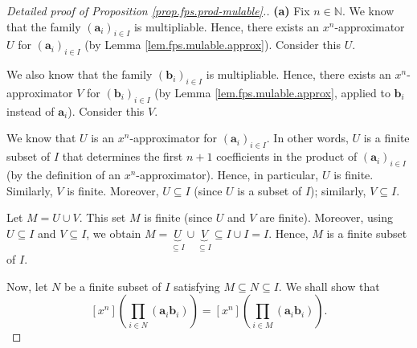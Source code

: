 \begin{fineprint}
\begin{proof}
[Detailed proof of Proposition \ref{prop.fps.prod-mulable}.]\textbf{(a)} Fix
$n\in\mathbb{N}$. We know that the family $\left(  \mathbf{a}_{i}\right)
_{i\in I}$ is multipliable. Hence, there exists an $x^{n}$-approximator $U$
for $\left(  \mathbf{a}_{i}\right)  _{i\in I}$ (by Lemma
\ref{lem.fps.mulable.approx}). Consider this $U$.

We also know that the family $\left(  \mathbf{b}_{i}\right)  _{i\in I}$ is
multipliable. Hence, there exists an $x^{n}$-approximator $V$ for $\left(
\mathbf{b}_{i}\right)  _{i\in I}$ (by Lemma \ref{lem.fps.mulable.approx},
applied to $\mathbf{b}_{i}$ instead of $\mathbf{a}_{i}$). Consider this $V$.

We know that $U$ is an $x^{n}$-approximator for $\left(  \mathbf{a}%
_{i}\right)  _{i\in I}$. In other words, $U$ is a finite subset of $I$ that
determines the first $n+1$ coefficients in the product of $\left(
\mathbf{a}_{i}\right)  _{i\in I}$ (by the definition of an $x^{n}%
$-approximator). Hence, in particular, $U$ is finite. Similarly, $V$ is
finite. Moreover, $U\subseteq I$ (since $U$ is a subset of $I$); similarly,
$V\subseteq I$.

Let $M=U\cup V$. This set $M$ is finite (since $U$ and $V$ are finite).
Moreover, using $U\subseteq I$ and $V\subseteq I$, we obtain $M=\underbrace{U}%
_{\subseteq I}\cup\underbrace{V}_{\subseteq I}\subseteq I\cup I=I$. Hence, $M$
is a finite subset of $I$.

Now, let $N$ be a finite subset of $I$ satisfying $M\subseteq N\subseteq I$.
We shall show that
\[
\left[  x^{n}\right]  \left(  \prod_{i\in N}\left(  \mathbf{a}_{i}%
\mathbf{b}_{i}\right)  \right)  =\left[  x^{n}\right]  \left(  \prod_{i\in
M}\left(  \mathbf{a}_{i}\mathbf{b}_{i}\right)  \right)  .
\]



\end{proof}
\end{fineprint}

